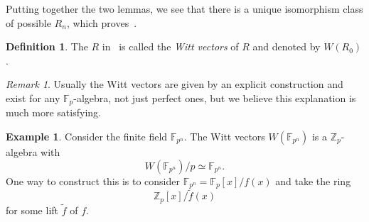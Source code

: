 \documentclass[10pt, oneside]{memoir}
\theoremstyle{definition}
\newtheorem{defn}[thm]{Definition}
\newtheorem{exm}[thm]{Example}
\theoremstyle{remark}
\newtheorem{rmk}[thm]{Remark}
\theoremstyle{plain}
\theoremstyle{definition}
\theoremstyle{remark}
\newcommand{\Z}{\mathbb{Z}}
\newcommand{\F}{\mathbb{F}}
\newcommand{\1}{\mathbf{1}}
\newcommand{\2}{\mathbf{2}}
\newcommand{\3}{\mathbf{3}}
\begin{document}
Putting together the two lemmas, we see that there is a unique isomorphism class of possible \(R_n \), which proves~.

\begin{defn}
    The \(R \) in~ is called the \textit{Witt vectors} of \(R \) and denoted by \(W(R_0) \).
\end{defn}

\begin{rmk}
    Usually the Witt vectors are given by an explicit construction and exist for any \(\F_p \)-algebra, not just perfect ones, but we believe this explanation is much more satisfying.
\end{rmk}

\begin{exm}
    Consider the finite field \(\F_{p^n} \). The Witt vectors \(W(\F_{p^n}) \)
    is a \(\Z_p \)-algebra with 
    \[ W(\F_{p^n}) / p \simeq \F_{p^n}. \] 
    One way to construct this is to consider \(\F_{p^n} = \F_p[x]/f(x) \) and take the ring
    \[ \Z_p[x]/\tilde{f}(x) \]
    for some lift \(\tilde{f} \) of \(f \).
\end{exm}
\end{document}
